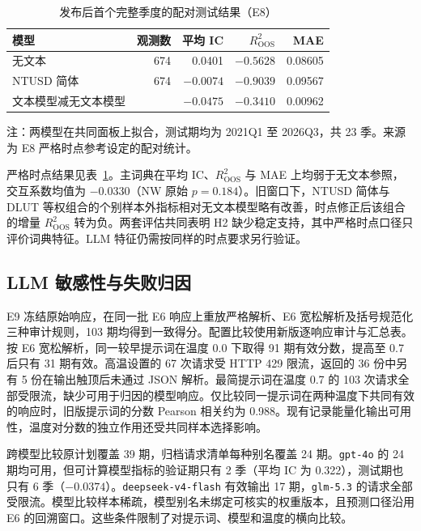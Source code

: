 \begin{table}[htbp]
  \centering\small
  \caption{发布后首个完整季度的配对测试结果（E8）}\label{tab:strict-oos}
  \begin{tabular}{lrrrr}
    \toprule
    模型 & 观测数 & 平均 IC & $R^2_{\mathrm{OOS}}$ & MAE \\
    \midrule
    无文本 & 674 & 0.0401 & $-0.5628$ & 0.08605 \\
    NTUSD 简体 & 674 & $-0.0074$ & $-0.9039$ & 0.09567 \\
    文本模型减无文本模型 & & $-0.0475$ & $-0.3410$ & 0.00962 \\
    \bottomrule
  \end{tabular}
  \par\smallskip
  \parbox{0.88\linewidth}{\footnotesize 注：两模型在共同面板上拟合，测试期均为 2021Q1 至 2026Q3，共 23 季。来源为 E8 严格时点参考设定的配对统计。}
\end{table}

严格时点结果见表~\ref{tab:strict-oos}。主词典在平均 IC、$R^2_{\mathrm{OOS}}$ 与 MAE 上均弱于无文本参照，交互系数均值为 $-0.0330$（NW 原始 $p=0.184$）。旧窗口下，NTUSD 简体与 DLUT 等权组合的个别样本外指标相对无文本模型略有改善，时点修正后该组合的增量 $R^2_{\mathrm{OOS}}$ 转为负。两套评估共同表明 H2 缺少稳定支持，其中严格时点口径只评价词典特征。LLM 特征仍需按同样的时点要求另行验证。

\subsection{LLM 敏感性与失败归因}

E9 冻结原始响应，在同一批 E6 响应上重放严格解析、E6 宽松解析及括号规范化三种审计规则，103 期均得到一致得分。配置比较使用新版逐响应审计与汇总表。按 E6 宽松解析，同一较早提示词在温度 0.0 下取得 91 期有效分数，提高至 0.7 后只有 31 期有效。高温设置的 67 次请求受 HTTP 429 限流，返回的 36 份中另有 5 份在输出触顶后未通过 JSON 解析。最简提示词在温度 0.7 的 103 次请求全部受限流，缺少可用于归因的模型响应。仅比较同一提示词在两种温度下共同有效的响应时，旧版提示词的分数 Pearson 相关约为 0.988。现有记录能量化输出可用性，温度对分数的独立作用还受共同样本选择影响。

跨模型比较原计划覆盖 39 期，归档请求清单每种别名覆盖 24 期。\texttt{gpt-4o} 的 24 期均可用，但可计算模型指标的验证期只有 2 季（平均 IC 为 0.322），测试期也只有 6 季（$-0.0374$）。\texttt{deepseek-v4-flash} 有效输出 17 期，\texttt{glm-5.3} 的请求全部受限流。模型比较样本稀疏，模型别名未绑定可核实的权重版本，且预测口径沿用 E6 的回溯窗口。这些条件限制了对提示词、模型和温度的横向比较。

